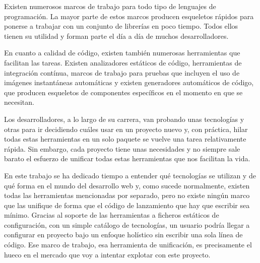 Existen numerosos marcos de trabajo para todo tipo de lenguajes de programación. La mayor parte de estos marcos producen esqueletos rápidos para ponerse a trabajar con un conjunto de librerías en poco tiempo. Todos ellos tienen su utilidad y forman parte el día a día de muchos desarrolladores.

En cuanto a calidad de código, existen también numerosas herramientas que facilitan las tareas. Existen analizadores estáticos de código, herramientas de integración contínua, marcos de trabajo para pruebas que incluyen el uso de imágenes instantáneas automáticas y existen generadores automáticos de código, que producen esqueletos de componentes específicos en el momento en que se necesitan.

Los desarrolladores, a lo largo de su carrera, van probando unas tecnologías y otras para ir decidiendo cuáles usar en un proyecto nuevo y, con práctica, hilar todas estas herramientas en un solo paquete se vuelve una tarea relativamente rápida. Sin embargo, cada proyecto tiene unas necesidades y no siempre sale barato el esfuerzo de unificar todas estas herramientas que nos facilitan la vida.

En este trabajo se ha dedicado tiempo a entender qué tecnologías se utilizan y de qué forma en el mundo del desarrollo web y, como sucede normalmente, existen todas las herramientas mencionadas por separado, pero no existe ningún marco que las unifique de forma que el código de lanzamiento que hay que escribir sea mínimo. Gracias al soporte de las herramientas a ficheros estáticos de configuración, con un simple catálogo de tecnologías, un usuario podría llegar a configurar en proyecto bajo un enfoque holístico sin escribir una sola línea de código. Ese marco de trabajo, esa herramienta de unificación, es precisamente el hueco en el mercado que voy a intentar explotar con este proyecto.
